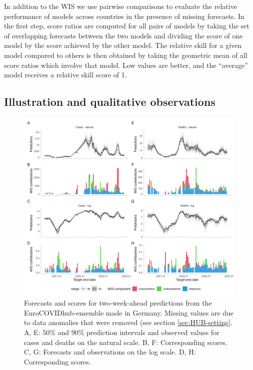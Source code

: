 \documentclass{article}
\begin{document}
In addition to the WIS we use pairwise comparisons \citep{cramerEvaluationIndividualEnsemble2021} to evaluate the relative performance of models across countries in the presence of missing forecasts. In the first step, score ratios are computed for all pairs of models by taking the set of overlapping forecasts between the two models and dividing the score of one model by the score achieved by the other model. The relative skill for a given model compared to others is then obtained by taking the geometric mean of all score ratios which involve that model. Low values are better, and the ``average'' model receives a relative skill score of 1. 


\subsection{Illustration and qualitative observations}

\begin{figure}[h!]
    \centering
    \includegraphics[width=0.99\textwidth]{output/figures/HUB-model-comparison-ensemble.png}
    \caption{
    Forecasts and scores for two-week-ahead predictions from the EuroCOVIDhub-ensemble made in Germany. Missing values are due to data anomalies that were removed (see section \ref{sec:HUB-setting}. 
    A, E: 50\% and 90\% prediction intervals and observed values for cases and deaths on the natural scale. B, F: Corresponding scores. C, G: Forecasts and observations on the log scale. D, H: Corresponding scores. 
    }
    \label{fig:HUB-model-comparison-ensemble}
\end{figure}
\end{document}
